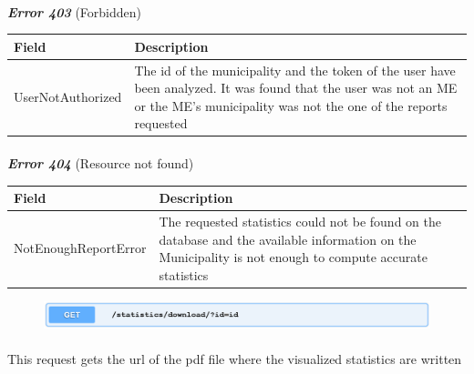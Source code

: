 						\paragraph{}
							\vspace{-5mm}
							\textcolor{myRed}{\textit{\textbf{Error 403}}} (Forbidden)
							\vspace{-2mm}
							\begin{table}[!h]
								\begin{tabular}{L{0.3\textwidth}L{0.62\textwidth}}
									\toprule
									\textbf{Field} & \textbf{Description} \\
									\midrule
								  	UserNotAuthorized & The id of the municipality and the token of the user have been analyzed. It was found that the user was not an ME or the ME's  municipality was not the one of the reports requested  \\
								 	\bottomrule
								\end{tabular}
							\end{table}
						\vspace{-5mm}
						\paragraph{}
							\textcolor{myRed}{\textit{\textbf{Error 404}}} (Resource not found)
							\vspace{-2mm}
							\begin{table}[!h]
								\begin{tabular}{L{0.3\textwidth}L{0.62\textwidth}}
									\toprule
									\textbf{Field} & \textbf{Description} \\
									\midrule
								  	NotEnoughReportError & The requested statistics could not be found on the database and the available information on the Municipality is not enough to compute accurate statistics \\
								 	\bottomrule
								\end{tabular}
							\end{table}
						
						\clearpage
						\begin{figure}
							\includegraphics[width=\textwidth]{images/Restful/DownloadStatistics}
						\end{figure}
						\paragraph{}
						\vspace{-7.5mm}
						This request gets the url of the pdf file where the visualized statistics are written
